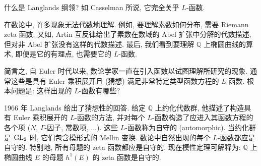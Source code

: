 什么是 Langlands 纲领? 如 Casselman 所说, 它完全关乎 $L$-函数.

在数论中, 许多现象无法代数地理解. 例如, 要理解素数如何分布, 需要 Riemann zeta 函数. 又如, Artin 互反律给出了素数在数域的 Abel 扩张中分解的代数描述, 但对非 Abel 扩张没有这样的代数描述. 最后, 我们看到要理解 $\mathbb{Q}$ 上椭圆曲线的算术, 即便是它的有理点, 也需要它的 $L$-函数.

简言之, 自 Euler 时代以来, 数论学家一直在引入函数以试图理解所研究的现象. 通常这些是具有 Euler 乘积展开且 (猜想) 满足非常特定类型函数方程的 $L$-函数. 根本问题是: 这样出现的 $L$-函数有哪些?

1966 年 Langlands 给出了猜想性的回答. 给定 $\mathbb{Q}$ 上约化代数群, 他描述了构造具有 Euler 乘积展开的 $L$-函数的方法, 并对每个 $L$-函数构造了应进入其函数方程的各个项 ($N$, $\Gamma$-因子, 常数项, $\dots$). 这些 $L$-函数称为自守的 (automorphic). 当约化群是 $\operatorname{GL}_2$ 时, 它们包含模形式的 Mellin 变换. 数论中自然出现的每个 $L$-函数都应是自守的. 特别地, 所有母题的 zeta 函数都应是自守的. 现在模性定理可解释为: $\mathbb{Q}$ 上椭圆曲线 $E$ 的母题 $h^1(E)$ 的 zeta 函数是自守的.
